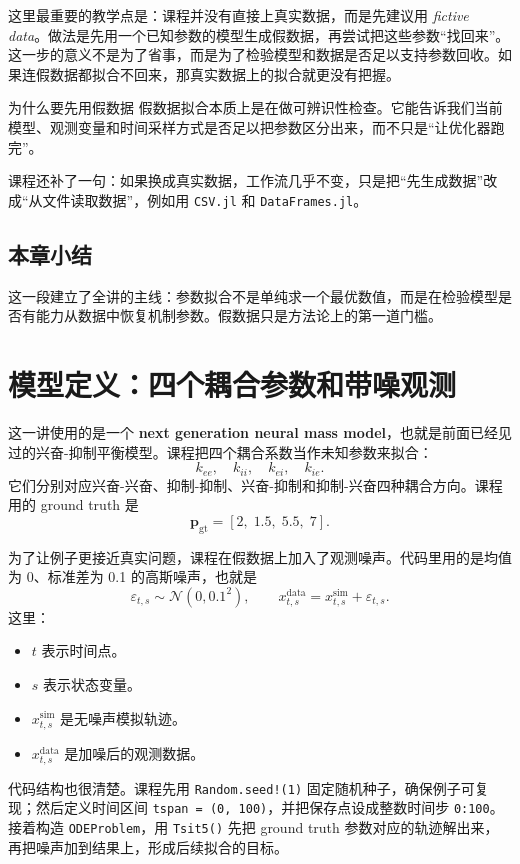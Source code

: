\documentclass[a4paper]{article}
\begin{document}
这里最重要的教学点是：课程并没有直接上真实数据，而是先建议用 \emph{fictive data}。做法是先用一个已知参数的模型生成假数据，再尝试把这些参数“找回来”。这一步的意义不是为了省事，而是为了检验模型和数据是否足以支持参数回收。如果连假数据都拟合不回来，那真实数据上的拟合就更没有把握。

\begin{knowledgebox}{为什么要先用假数据}
假数据拟合本质上是在做可辨识性检查。它能告诉我们当前模型、观测变量和时间采样方式是否足以把参数区分出来，而不只是“让优化器跑完”。
\end{knowledgebox}

课程还补了一句：如果换成真实数据，工作流几乎不变，只是把“先生成数据”改成“从文件读取数据”，例如用 \texttt{CSV.jl} 和 \texttt{DataFrames.jl}。

\subsection{本章小结}
这一段建立了全讲的主线：参数拟合不是单纯求一个最优数值，而是在检验模型是否有能力从数据中恢复机制参数。假数据只是方法论上的第一道门槛。

\section{模型定义：四个耦合参数和带噪观测}
这一讲使用的是一个 \textbf{next generation neural mass model}，也就是前面已经见过的兴奋-抑制平衡模型。课程把四个耦合系数当作未知参数来拟合：
\[
k_{ee},\quad k_{ii},\quad k_{ei},\quad k_{ie}.
\]
它们分别对应兴奋-兴奋、抑制-抑制、兴奋-抑制和抑制-兴奋四种耦合方向。课程用的 ground truth 是
\[
\mathbf p_{\mathrm{gt}} = [2,\; 1.5,\; 5.5,\; 7].
\]

为了让例子更接近真实问题，课程在假数据上加入了观测噪声。代码里用的是均值为 0、标准差为 0.1 的高斯噪声，也就是
\begin{equation}
\varepsilon_{t,s} \sim \mathcal N(0, 0.1^2), \qquad
x^{\mathrm{data}}_{t,s} = x^{\mathrm{sim}}_{t,s} + \varepsilon_{t,s}.
\end{equation}
这里：
\begin{itemize}
    \item $t$ 表示时间点。
    \item $s$ 表示状态变量。
    \item $x^{\mathrm{sim}}_{t,s}$ 是无噪声模拟轨迹。
    \item $x^{\mathrm{data}}_{t,s}$ 是加噪后的观测数据。
\end{itemize}

代码结构也很清楚。课程先用 \texttt{Random.seed!(1)} 固定随机种子，确保例子可复现；然后定义时间区间 \texttt{tspan = (0, 100)}，并把保存点设成整数时间步 \texttt{0:100}。接着构造 \texttt{ODEProblem}，用 \texttt{Tsit5()} 先把 ground truth 参数对应的轨迹解出来，再把噪声加到结果上，形成后续拟合的目标。
\end{document}
